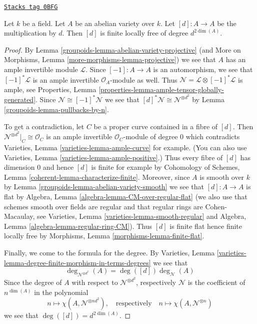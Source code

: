 \begin{lemma}
\label{groupoids-lemma-degree-multiplication-by-d}
\href{https://stacks.math.columbia.edu/tag/0BFG}{\texttt{Stacks tag 0BFG}}

Let $k$ be a field. Let $A$ be an abelian variety over $k$.
Let $[d] : A \to A$ be the multiplication by $d$.
Then $[d]$ is finite locally free of degree $d^{2\dim(A)}$.
\end{lemma}

\begin{proof}

By Lemma \ref{groupoids-lemma-abelian-variety-projective}
(and More on Morphisms, Lemma \ref{more-morphisms-lemma-projective})
we see that $A$ has an ample invertible module $\mathcal{L}$.
Since $[-1] : A \to A$ is an automorphism, we see that
$[-1]^*\mathcal{L}$ is an ample invertible $\mathcal{O}_A$-module
as well. Thus $\mathcal{N} = \mathcal{L} \otimes [-1]^*\mathcal{L}$
is ample, see
Properties, Lemma \ref{properties-lemma-ample-tensor-globally-generated}.
Since $\mathcal{N} \cong [-1]^*\mathcal{N}$ we see that
$[d]^*\mathcal{N} \cong \mathcal{N}^{\otimes d^2}$ by
Lemma \ref{groupoids-lemma-pullbacks-by-n}.

\medskip\noindent
To get a contradiction, let $C$ be a proper curve contained in a
fibre of $[d]$. Then $\mathcal{N}^{\otimes d^2}|_C \cong \mathcal{O}_C$
is an ample invertible $\mathcal{O}_C$-module of degree $0$ which
contradicts Varieties, Lemma \ref{varieties-lemma-ample-curve} for example.
(You can also use Varieties, Lemma \ref{varieties-lemma-ample-positive}.)
Thus every fibre of $[d]$ has dimension $0$ and hence $[d]$ is finite
for example by Cohomology of Schemes, Lemma
\ref{coherent-lemma-characterize-finite}.
Moreover, since $A$ is smooth over $k$ by
Lemma \ref{groupoids-lemma-abelian-variety-smooth}
we see that $[d] : A \to A$ is flat by
Algebra, Lemma \ref{algebra-lemma-CM-over-regular-flat}
(we also use that schemes smooth over fields are regular and that
regular rings are Cohen-Macaulay, see
Varieties, Lemma \ref{varieties-lemma-smooth-regular} and
Algebra, Lemma \ref{algebra-lemma-regular-ring-CM}).
Thus $[d]$ is finite flat hence finite locally free by
Morphisms, Lemma \ref{morphisms-lemma-finite-flat}.

\medskip\noindent
Finally, we come to the formula for the degree. By
Varieties, Lemma \ref{varieties-lemma-degree-finite-morphism-in-terms-degrees}
we see that
$$
\deg_{\mathcal{N}^{\otimes d^2}}(A) = \deg([d]) \deg_\mathcal{N}(A)
$$
Since the degree of $A$ with respect to
$\mathcal{N}^{\otimes d^2}$, respectively $\mathcal{N}$
is the coefficient of $n^{\dim(A)}$ in the polynomial
$$
n \longmapsto \chi(A, \mathcal{N}^{\otimes nd^2}),\quad
\text{respectively}\quad n \longmapsto \chi(A, \mathcal{N}^{\otimes n})
$$
we see that $\deg([d]) = d^{2 \dim(A)}$.
\end{proof}


